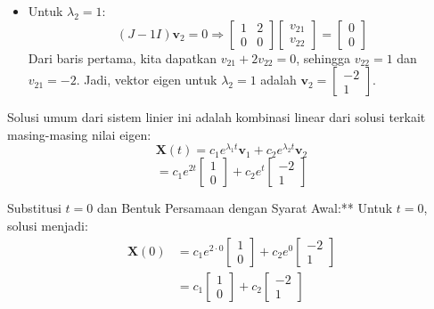 \documentclass{article}
\begin{document}
\begin{enumerate}
\begin{enumerate}[label=\alph*.]
\begin{itemize}
                \item Untuk \( \lambda_2 = 1 \):
                \[
                (J - 1I)\mathbf{v}_2 = 0 \Rightarrow \begin{bmatrix} 1 & 2 \\ 0 & 0 \end{bmatrix} \begin{bmatrix} v_{21} \\ v_{22} \end{bmatrix} = \begin{bmatrix} 0 \\ 0 \end{bmatrix}
                \]
                Dari baris pertama, kita dapatkan \( v_{21} + 2v_{22} = 0 \), sehingga \( v_{22} = 1 \) dan \( v_{21} = -2 \). Jadi, vektor eigen untuk \( \lambda_2 = 1 \) adalah \( \mathbf{v}_2 = \begin{bmatrix} -2 \\ 1 \end{bmatrix} \).
            \end{itemize}
            Solusi umum dari sistem linier ini adalah kombinasi linear dari solusi terkait masing-masing nilai eigen:
                \[
                \mathbf{X}(t) = c_1 e^{\lambda_1 t} \mathbf{v}_1 + c_2 e^{\lambda_2 t} \mathbf{v}_2
                \]
                \[
                = c_1 e^{2t} \begin{bmatrix} 1 \\ 0 \end{bmatrix} + c_2 e^{t} \begin{bmatrix} -2 \\ 1 \end{bmatrix}
                \]

            Substitusi \( t = 0 \) dan Bentuk Persamaan dengan Syarat Awal:**
            Untuk \( t = 0 \), solusi menjadi:
            \begin{align*}
            \mathbf{X}(0) &= c_1 e^{2 \cdot 0} \begin{bmatrix} 1 \\ 0 \end{bmatrix} + c_2 e^{0} \begin{bmatrix} -2 \\ 1 \end{bmatrix} \\
            &= c_1 \begin{bmatrix} 1 \\ 0 \end{bmatrix} + c_2 \begin{bmatrix} -2 \\ 1 \end{bmatrix}
            \end{align*}
         

\end{enumerate}
\end{enumerate}
\end{document}
